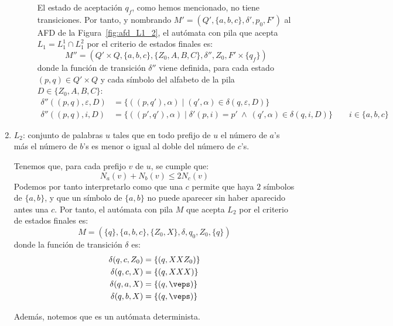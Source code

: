 \documentclass[12pt]{article}
\begin{document}
\begin{ejercicio}[2.5 puntos]
\begin{enumerate}
\begin{description}
                El estado de aceptación $q_f$, como hemos mencionado, no tiene transiciones. Por tanto, y nombrando $M'=(Q',\{a,b,c\},\delta',p_0,F')$ al AFD de la Figura~\ref{fig:afd_L1_2}, el autómata con pila que acepta $L_1=L_1^1\cap L_1^2$ por el criterio de estados finales es:
                \begin{equation*}
                    M''=(Q'\times Q,\{a,b,c\},\{Z_0,A,B,C\},\delta'',Z_0,F'\times\{q_f\})
                \end{equation*}
                donde la función de transición $\delta''$ viene definida, para cada estado $(p,q)\in Q'\times Q$ y cada símbolo del alfabeto de la pila $D\in \{Z_0,A,B,C\}$:
                \begin{align*}
                    \delta''((p,q),\varepsilon,D) &= \{((p,q'),\alpha)\mid (q',\alpha)\in \delta(q,\varepsilon,D)\} \\
                    \delta''((p,q),i,D) &= \{((p',q'),\alpha)\mid \delta'(p,i)=p'~\land~ (q',\alpha)\in \delta(q,i,D)\} \qquad i\in \{a,b,c\}
                \end{align*}
            \end{description}

            \item $L_2$: conjunto de palabras $u$ tales que en todo prefijo de $u$ el número de $a$'s más el número de $b$'s es menor o igual al doble del número de $c$'s.
            
            Tenemos que, para cada prefijo $v$ de $u$, se cumple que:
            \begin{equation*}
                N_a(v)+N_b(v)\leq 2N_c(v)
            \end{equation*}
            Podemos por tanto interpretarlo como que una $c$ permite que haya $2$ símbolos de $\{a,b\}$, y que un símbolo de $\{a,b\}$ no puede aparecer sin haber aparecido antes una $c$. Por tanto, el autómata con pila $M$ que acepta $L_2$ por el criterio de estados finales es:
            \begin{equation*}
                M=(\{q\},\{a,b,c\},\{Z_0,X\},\delta,q_0,Z_0,\{q\})
            \end{equation*}
            donde la función de transición $\delta$ es:
            \begin{align*}
                \delta(q,c,Z_0) &= \{(q,XXZ_0)\}\\
                \delta(q,c,X) &= \{(q,XXX)\}\\
                \delta(q,a,X) &= \{(q,\veps)\}\\
                \delta(q,b,X) &= \{(q,\veps)\}
            \end{align*}

            Además, notemos que es un autómata determinista.
        \end{enumerate}
    \end{ejercicio}
\end{document}
